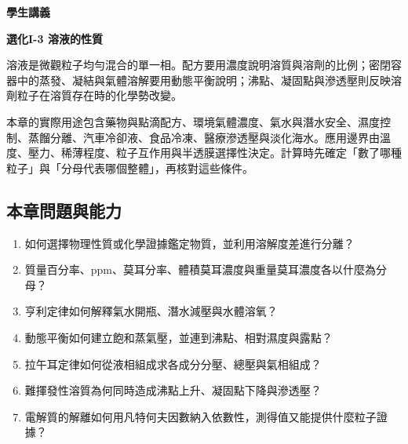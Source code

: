\documentclass[11pt,a4paper]{article}
\providecommand{\tightlist}{%
  \setlength{\itemsep}{0pt}\setlength{\parskip}{0pt}}
\begin{document}
\begin{tcolorbox}[
  enhanced,colback=white,colframe=HandoutBlue,boxrule=1.1pt,arc=2mm,
  borderline west={3pt}{0pt}{HandoutBlue},left=5mm,right=4mm,top=4mm,bottom=4mm
]
{\sffamily\small\bfseries\color{HandoutBlue}學生講義}\par
{\sffamily\bfseries\LARGE\color{HandoutInk}選化I-3 溶液的性質}\par
\vspace{0.35em}{\large 由粒子數、分子間作用力與相平衡，連結濃度、蒸氣壓、沸點、凝固點與滲透壓}\par
{}\par
{}\par
\end{tcolorbox}


溶液是微觀粒子均勻混合的單一相。配方要用濃度說明溶質與溶劑的比例；密閉容器中的蒸發、凝結與氣體溶解要用動態平衡說明；沸點、凝固點與滲透壓則反映溶劑粒子在溶質存在時的化學勢改變。

本章的實際用途包含藥物與點滴配方、環境氣體濃度、氣水與潛水安全、濕度控制、蒸餾分離、汽車冷卻液、食品冷凍、醫療滲透壓與淡化海水。應用邊界由溫度、壓力、稀薄程度、粒子互作用與半透膜選擇性決定。計算時先確定「數了哪種粒子」與「分母代表哪個整體」，再核對這些條件。

\begin{HandoutLearningMap}

\subsection{本章問題與能力}\label{ux672cux7ae0ux554fux984cux8207ux80fdux529b}

\begin{enumerate}
\def\labelenumi{\arabic{enumi}.}
\tightlist
\item
  如何選擇物理性質或化學證據鑑定物質，並利用溶解度差進行分離？
\item
  質量百分率、ppm、莫耳分率、體積莫耳濃度與重量莫耳濃度各以什麼為分母？
\item
  亨利定律如何解釋氣水開瓶、潛水減壓與水體溶氧？
\item
  動態平衡如何建立飽和蒸氣壓，並連到沸點、相對濕度與露點？
\item
  拉午耳定律如何從液相組成求各成分分壓、總壓與氣相組成？
\item
  難揮發性溶質為何同時造成沸點上升、凝固點下降與滲透壓？
\item
  電解質的解離如何用凡特何夫因數納入依數性，測得值又能提供什麼粒子證據？
\end{enumerate}

\end{HandoutLearningMap}
\end{document}

